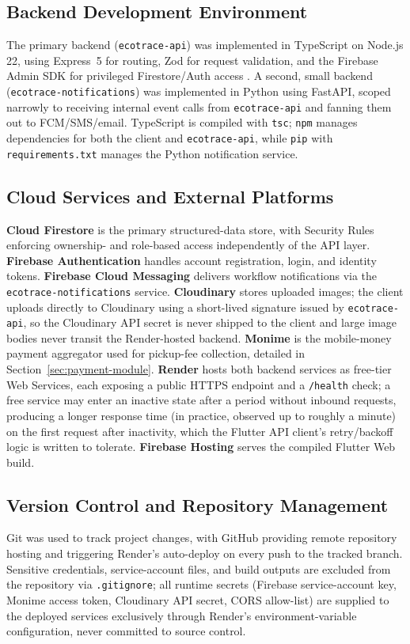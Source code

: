\subsection{Backend Development Environment}
The primary backend (\texttt{ecotrace-api}) was implemented in TypeScript
on Node.js 22, using Express~5 for routing, Zod for request validation, and
the Firebase Admin SDK for privileged Firestore/Auth access
\citep{express2026,firebase2026admin}. A second, small backend
(\texttt{ecotrace-notifications}) was implemented in Python using FastAPI,
scoped narrowly to receiving internal event calls from \texttt{ecotrace-api} and
fanning them out to FCM/SMS/email. TypeScript is compiled with \texttt{tsc};
\texttt{npm} manages dependencies for both the client and \texttt{ecotrace-api},
while \texttt{pip} with \texttt{requirements.txt} manages the Python
notification service.

\subsection{Cloud Services and External Platforms}

\textbf{Cloud Firestore} is the primary structured-data store, with Security
Rules enforcing ownership- and role-based access independently of the API
layer. \textbf{Firebase Authentication} handles account registration, login, and
identity tokens. \textbf{Firebase Cloud Messaging} delivers workflow
notifications via the \texttt{ecotrace-notifications} service. \textbf{Cloudinary}
stores uploaded images; the client uploads directly to Cloudinary using a
short-lived signature issued by \texttt{ecotrace-api}, so the Cloudinary API
secret is never shipped to the client and large image bodies never transit the
Render-hosted backend. \textbf{Monime} \citep{monime2026} is the mobile-money
payment aggregator used for pickup-fee collection, detailed in
Section~\ref{sec:payment-module}. \textbf{Render} hosts both backend services
as free-tier Web Services, each exposing a public HTTPS endpoint and a
\texttt{/health} check; a free service may enter an inactive state after a period
without inbound requests, producing a longer response time (in practice,
observed up to roughly a minute) on the first request after inactivity, which
the Flutter API client's retry/backoff logic is written to tolerate.
\textbf{Firebase Hosting} serves the compiled Flutter Web build.

\subsection{Version Control and Repository Management}
Git was used to track project changes, with GitHub providing remote
repository hosting and triggering Render's auto-deploy on every push to the
tracked branch. Sensitive credentials, service-account files, and build outputs
are excluded from the repository via \texttt{.gitignore}; all runtime secrets
(Firebase service-account key, Monime access token, Cloudinary API secret,
CORS allow-list) are supplied to the deployed services exclusively through
Render's environment-variable configuration, never committed to source
control.

